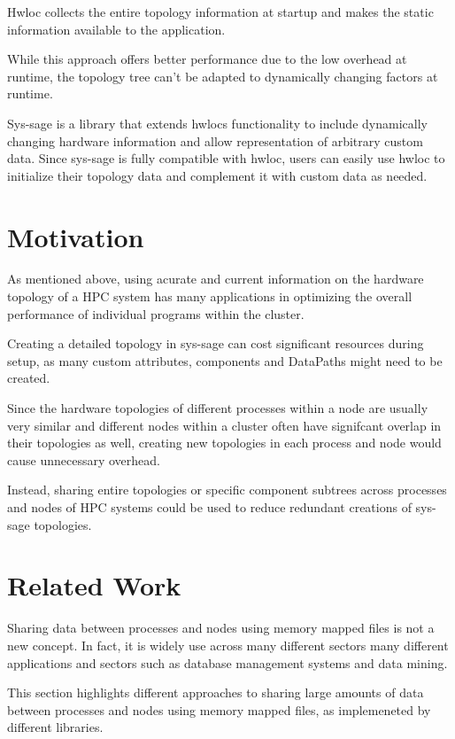Hwloc collects the entire topology information at startup and makes the static information available to the application. \cite{hwloc_paper}

While this approach offers better performance due to the low overhead at runtime, the topology tree can't be adapted to dynamically changing factors at runtime.

Sys-sage \cite{sys-sage} is a library that extends hwlocs functionality to include dynamically changing hardware information and allow representation of arbitrary custom data.
Since sys-sage is fully compatible with hwloc, users can easily use hwloc to initialize their topology data and complement it with custom data as needed.

\section{Motivation}
As mentioned above, using acurate and current information on the hardware topology of a HPC system
has many applications in optimizing the overall performance of individual programs within the cluster.

Creating a detailed topology in sys-sage can cost significant resources during setup, as many custom attributes, components and DataPaths might need to be created.

Since the hardware topologies of different processes within a node are usually very similar
and different nodes within a cluster often have signifcant overlap in their topologies as well, creating new topologies in each process and node would cause unnecessary overhead.

Instead, sharing entire topologies or specific component subtrees across processes and nodes of HPC systems could be used to reduce redundant creations of sys-sage topologies.

\section{Related Work}
Sharing data between processes and nodes using memory mapped files is not a new concept. In fact, it is widely use across many different sectors many different applications and sectors such as
database management systems and data mining. \cite{crotty22-mmap} \cite{mmap_related_work}

This section highlights different approaches to sharing large amounts of data between processes and nodes using memory mapped files, as implemeneted by different libraries.

